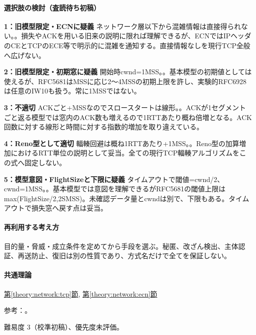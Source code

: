\paragraph{選択肢の検討（査読待ち初稿）}\mbox{}\par

\noindent\textbf{1：旧模型限定・ECNに疑義} ネットワーク層以下から混雑情報は直接得られない。。損失やACKを用いる旧来の説明に限れば理解できるが、ECNではIPヘッダのCEとTCPのECE等で明示的に混雑を通知する。直接情報なしを現行TCP全般へ広げない。\par

\noindent\textbf{2：旧模型限定・初期窓に疑義} 開始時cwnd=\allowbreak{}1MSS。。基本模型の初期値としては使えるが、RFC5681はMSSに応じ2〜4MSSの初期上限を許し、実験的RFC6928は任意のIW10も扱う。常に1MSSではない。\par

\noindent\textbf{3：不適切} ACKごと+MSSなのでスロースタートは線形。。ACKが1セグメントごと返る模型では窓内のACK数も増えるので1RTTあたり概ね倍増となる。ACK回数に対する線形と時間に対する指数的増加を取り違えている。\par

\noindent\textbf{4：Reno型として適切} 輻輳回避は概ね1RTTあたり+1MSS。。Reno型の加算増加におけるRTT単位の説明として妥当。全ての現行TCP輻輳アルゴリズムをこの式へ固定しない。\par

\noindent\textbf{5：模型意図・FlightSizeと下限に疑義} タイムアウトで閾値=cwnd/2、cwnd=\allowbreak{}1MSS。。基本模型では意図を理解できるがRFC5681の閾値上限はmax(FlightSize/2,2SMSS)。未確認データ量とcwndは別で、下限もある。タイムアウトで損失窓へ戻す点は妥当。\par

\paragraph{再利用する考え方} 目的量・脅威・成立条件を定めてから手段を選ぶ。秘匿、改ざん検出、主体認証、再送防止、復旧は別の性質であり、方式名だけで全てを保証しない。

\paragraph{共通理論} \hyperref[theory:network:tcp]{第\ref*{theory:network:tcp}節}, \hyperref[theory:network:ecn]{第\ref*{theory:network:ecn}節}

\par 参考：\cite{net_tcp2009,net_ecn2001,net_iw2013}。

\par 難易度 3（校準初稿）、優先度未評価。
